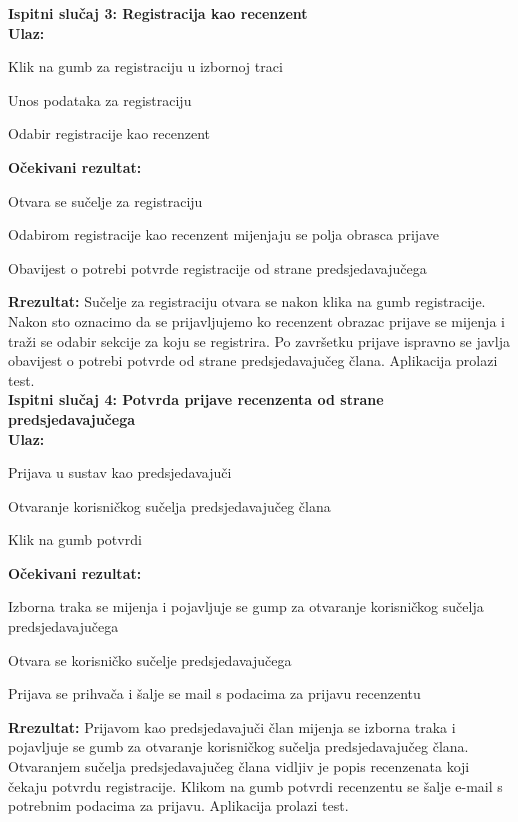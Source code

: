 			
			 \textbf{Ispitni slučaj 3: Registracija kao recenzent}\\
			 \textbf{Ulaz:}
			 \begin{packed_item}
			 	\item {Klik na gumb za registraciju u izbornoj traci}
			 	\item {Unos podataka za registraciju}
			 	\item {Odabir registracije kao recenzent}
			 \end{packed_item}
			 \textbf{Očekivani rezultat:}
			 \begin{packed_item}
			 	\item {Otvara se sučelje za registraciju}
			 	\item {Odabirom registracije kao recenzent mijenjaju se polja obrasca prijave}
			 	\item {Obavijest o potrebi potvrde registracije od strane predsjedavajučega}
			 \end{packed_item}
			 \textbf{Rrezultat: }Sučelje za registraciju otvara se nakon klika na gumb registracije. Nakon sto oznacimo da se prijavljujemo ko recenzent obrazac prijave se mijenja i traži se odabir sekcije za koju se registrira. Po završetku prijave ispravno se javlja obavijest o potrebi potvrde od strane predsjedavajučeg člana. Aplikacija prolazi test.\\
			
			
			 \textbf{Ispitni slučaj 4: Potvrda prijave recenzenta od strane predsjedavajučega}\\
			 \textbf{Ulaz:}
			 \begin{packed_item}
			 	\item {Prijava u sustav kao predsjedavajuči}
			 	\item {Otvaranje korisničkog sučelja predsjedavajučeg člana}
			 	\item {Klik na gumb potvrdi}
			 \end{packed_item}
			 \textbf{Očekivani rezultat:}
			 \begin{packed_item}
			 	\item {Izborna traka se mijenja i pojavljuje se gump za otvaranje korisničkog sučelja predsjedavajučega}
			 	\item {Otvara se korisničko sučelje predsjedavajučega}
			 	\item {Prijava se prihvača i šalje se mail s podacima za prijavu recenzentu}
			 \end{packed_item}
			 \textbf{Rrezultat: }Prijavom kao predsjedavajuči član mijenja se izborna traka i pojavljuje se gumb za otvaranje korisničkog sučelja predsjedavajučeg člana. Otvaranjem sučelja predsjedavajučeg člana vidljiv je popis recenzenata koji čekaju potvrdu registracije. Klikom na gumb potvrdi recenzentu se šalje e-mail s potrebnim podacima za prijavu. Aplikacija prolazi test.\\
			\eject 
		
